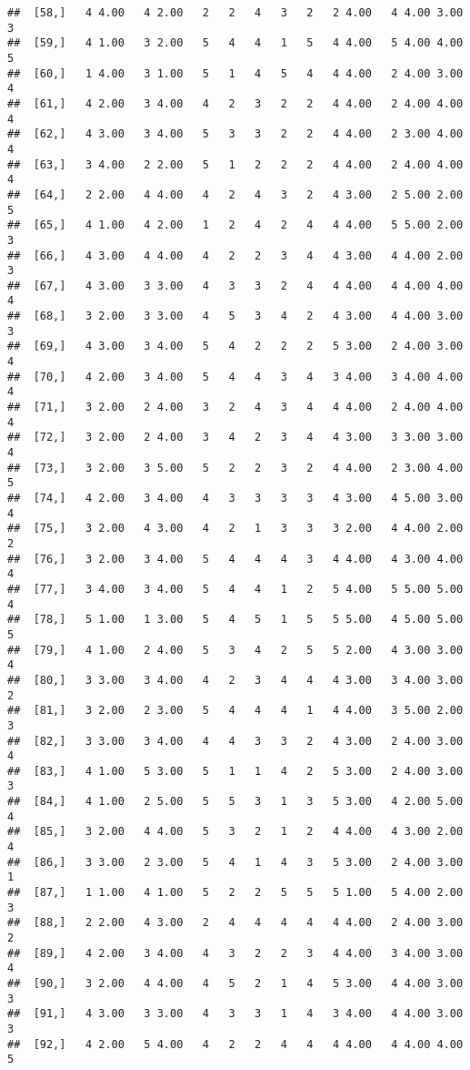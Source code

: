\documentclass[]{article}
\begin{document}
\begin{verbatim}
##  [58,]   4 4.00   4 2.00   2   2   4   3   2   2 4.00   4 4.00 3.00   3
##  [59,]   4 1.00   3 2.00   5   4   4   1   5   4 4.00   5 4.00 4.00   5
##  [60,]   1 4.00   3 1.00   5   1   4   5   4   4 4.00   2 4.00 3.00   4
##  [61,]   4 2.00   3 4.00   4   2   3   2   2   4 4.00   2 4.00 4.00   4
##  [62,]   4 3.00   3 4.00   5   3   3   2   2   4 4.00   2 3.00 4.00   4
##  [63,]   3 4.00   2 2.00   5   1   2   2   2   4 4.00   2 4.00 4.00   4
##  [64,]   2 2.00   4 4.00   4   2   4   3   2   4 3.00   2 5.00 2.00   5
##  [65,]   4 1.00   4 2.00   1   2   4   2   4   4 4.00   5 5.00 2.00   3
##  [66,]   4 3.00   4 4.00   4   2   2   3   4   4 3.00   4 4.00 2.00   3
##  [67,]   4 3.00   3 3.00   4   3   3   2   4   4 4.00   4 4.00 4.00   4
##  [68,]   3 2.00   3 3.00   4   5   3   4   2   4 3.00   4 4.00 3.00   3
##  [69,]   4 3.00   3 4.00   5   4   2   2   2   5 3.00   2 4.00 3.00   4
##  [70,]   4 2.00   3 4.00   5   4   4   3   4   3 4.00   3 4.00 4.00   4
##  [71,]   3 2.00   2 4.00   3   2   4   3   4   4 4.00   2 4.00 4.00   4
##  [72,]   3 2.00   2 4.00   3   4   2   3   4   4 3.00   3 3.00 3.00   4
##  [73,]   3 2.00   3 5.00   5   2   2   3   2   4 4.00   2 3.00 4.00   5
##  [74,]   4 2.00   3 4.00   4   3   3   3   3   4 3.00   4 5.00 3.00   4
##  [75,]   3 2.00   4 3.00   4   2   1   3   3   3 2.00   4 4.00 2.00   2
##  [76,]   3 2.00   3 4.00   5   4   4   4   3   4 4.00   4 3.00 4.00   4
##  [77,]   3 4.00   3 4.00   5   4   4   1   2   5 4.00   5 5.00 5.00   4
##  [78,]   5 1.00   1 3.00   5   4   5   1   5   5 5.00   4 5.00 5.00   5
##  [79,]   4 1.00   2 4.00   5   3   4   2   5   5 2.00   4 3.00 3.00   4
##  [80,]   3 3.00   3 4.00   4   2   3   4   4   4 3.00   3 4.00 3.00   2
##  [81,]   3 2.00   2 3.00   5   4   4   4   1   4 4.00   3 5.00 2.00   3
##  [82,]   3 3.00   3 4.00   4   4   3   3   2   4 3.00   2 4.00 3.00   4
##  [83,]   4 1.00   5 3.00   5   1   1   4   2   5 3.00   2 4.00 3.00   3
##  [84,]   4 1.00   2 5.00   5   5   3   1   3   5 3.00   4 2.00 5.00   4
##  [85,]   3 2.00   4 4.00   5   3   2   1   2   4 4.00   4 3.00 2.00   4
##  [86,]   3 3.00   2 3.00   5   4   1   4   3   5 3.00   2 4.00 3.00   1
##  [87,]   1 1.00   4 1.00   5   2   2   5   5   5 1.00   5 4.00 2.00   3
##  [88,]   2 2.00   4 3.00   2   4   4   4   4   4 4.00   2 4.00 3.00   2
##  [89,]   4 2.00   3 4.00   4   3   2   2   3   4 4.00   3 4.00 3.00   4
##  [90,]   3 2.00   4 4.00   4   5   2   1   4   5 3.00   4 4.00 3.00   3
##  [91,]   4 3.00   3 3.00   4   3   3   1   4   3 4.00   4 4.00 3.00   3
##  [92,]   4 2.00   5 4.00   4   2   2   4   4   4 4.00   4 4.00 4.00   5

\end{verbatim}
\end{document}
